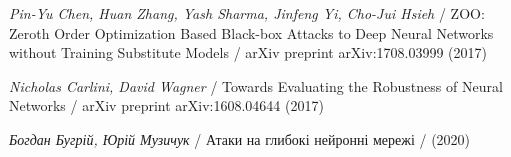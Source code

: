 \documentclass[14pt,a4paper]{extarticle}
\newcounter{e}
\numberwithin{equation}{section}
\numberwithin{figure}{section}
\begin{document}
\begin{thebibliography}{99}
	\textit{Pin-Yu Chen, Huan Zhang, Yash Sharma, Jinfeng Yi, Cho-Jui Hsieh} /
	ZOO: Zeroth Order Optimization Based Black-box Attacks to Deep Neural Networks without Training Substitute Models /
	arXiv preprint arXiv:1708.03999 (2017)
	
	\textit{Nicholas Carlini, David Wagner} /
	Towards Evaluating the Robustness of Neural Networks /
	arXiv preprint arXiv:1608.04644 (2017)
	
	\textit{Богдан Бугрій, Юрій Музичук} /
	Атаки на глибокі нейронні мережі /
	(2020)
	
	
 \end{thebibliography}

 
\end{document}

